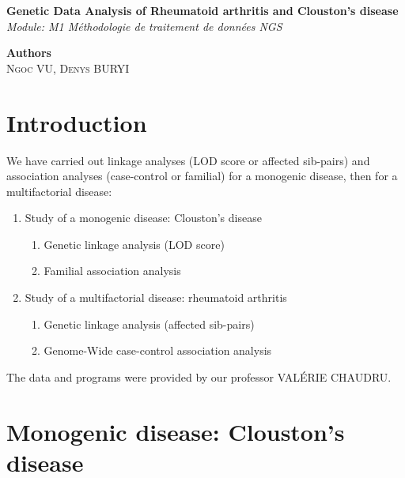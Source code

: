 \documentclass[a4paper,12pt]{article}
\begin{document}
\begin{titlepage}
    \begin{center}
        {\Large \textbf{Genetic Data Analysis of Rheumatoid arthritis and Clouston's disease}} \\[1cm] 
        
        \textit{Module: M1 Méthodologie de traitement de données NGS} \\[3cm]
        

        \vfill %

        \textbf{Authors} \\[0.5cm]
        \textsc{Ngoc VU, Denys BURYI}


    \end{center}
\end{titlepage}

\newpage


\section*{Introduction}

We have carried out linkage analyses (LOD score or affected sib-pairs) 
and association analyses (case-control or familial) for a monogenic disease, then for a multifactorial disease:
\begin{enumerate}
    \item Study of a monogenic disease: Clouston's disease
    \begin{enumerate}
        \item Genetic linkage analysis (LOD score)
        \item Familial association analysis
    \end{enumerate}
    \item Study of a multifactorial disease: rheumatoid arthritis
    \begin{enumerate}
        \item Genetic linkage analysis (affected sib-pairs)
        \item Genome-Wide case-control association analysis
    \end{enumerate}
\end{enumerate}

 
The data and programs were provided by our professor VALÉRIE CHAUDRU.

\section{Monogenic disease: Clouston's disease}
\end{document}
